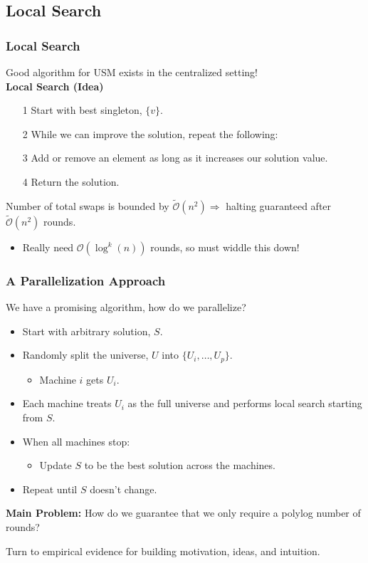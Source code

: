 \documentclass{beamer}
\begin{document}
\begin{frame}
\section{Local Search}
\frametitle{Local Search}
Good algorithm for USM exists in the centralized setting!\\
\vspace{0.6 cm}
\textbf{Local Search (Idea)}
\begin{enumerate}
\item[1] Start with best singleton, $\{v\}$. 
\item[2] While we can improve the solution, repeat the following: 
\item[3] Add or remove an element as long as it increases our solution value. 
\item[4] Return the solution. 
\end{enumerate}

\vspace{0.4 cm}
Number of total swaps is bounded by $\tilde{\mathcal{O}}(n^2) \Rightarrow$ halting guaranteed after $\tilde{\mathcal{O}}(n^2)$ rounds.
\begin{itemize}
\item Really need $\mathcal{O} (\log ^k (n))$ rounds, so must widdle this down!
\end{itemize}
\end{frame}

\begin{frame}
\frametitle{A Parallelization Approach}
We have a promising algorithm, how do we parallelize?

\begin{itemize}
\item Start with arbitrary solution, $S$.
\item Randomly split the universe, $U$ into $\{U_i, \ldots , U_p \}$.
\begin{itemize}
\item Machine $i$ gets $U_i$.
\end{itemize}
\item Each machine treats $U_i$ as the full universe and performs local search starting from $S$. 
\item When all machines stop:
\begin{itemize}
\item Update $S$ to be the best solution across the machines.
\end{itemize}
\item Repeat until $S$ doesn't change.
\end{itemize}

\vspace{0.4 cm}
\textbf{Main Problem:} How do we guarantee that we only require a polylog number of rounds?

\vspace{0.4 cm}
Turn to empirical evidence for building motivation, ideas, and intuition.

\end{frame}
\end{document}
